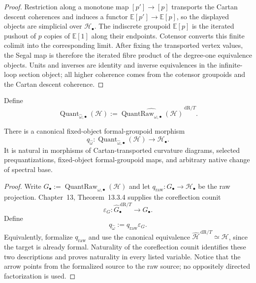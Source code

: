 \begin{proof}
Restriction along a monotone map $[p']\to[p]$ transports the Cartan descent
coherences and induces a functor $\mathbb E[p']\to\mathbb E[p]$, so the displayed
objects are simplicial over $\mathcal H_\bullet$.  The indiscrete groupoid
$\mathbb E[p]$ is the iterated pushout of $p$ copies of $\mathbb E[1]$ along their
endpoints.  Cotensor converts this finite colimit into the corresponding limit.
After fixing the transported vertex values, the Segal map is therefore the
iterated fibre product of the degree-one equivalence objects.  Units and inverses
are identity and inverse equivalences in the infinite-loop section object; all
higher coherence comes from the cotensor groupoids and the Cartan descent
coherence.
\end{proof}

\begin{definition}
\label{def:prequantum-formal-quantomorphism-groupoid}
Define
\[
\boxed{
\operatorname{Quant}_{\widehat\omega,\bullet}(\mathcal H)
:=
\widehat{\operatorname{QuantRaw}_{\widehat\omega,\bullet}(\mathcal H)}^{\,\mathrm{dR}/T}.
}
\]
\end{definition}

\begin{theorem}
\label{thm:prequantum-canonical-quantomorphism-anchor}
There is a canonical fixed-object formal-groupoid morphism
\[
\boxed{
q_{\widehat\omega}:
\operatorname{Quant}_{\widehat\omega,\bullet}(\mathcal H)
\longrightarrow
\mathcal H_\bullet.
}
\]
It is natural in morphisms of Cartan-transported curvature diagrams, selected
prequantizations, fixed-object formal-groupoid maps, and arbitrary native change of
spectral base.
\end{theorem}

\begin{proof}
Write $G_\bullet:=
\operatorname{QuantRaw}_{\widehat\omega,\bullet}(\mathcal H)$ and let
$q_{\mathrm{raw}}:G_\bullet\to\mathcal H_\bullet$ be the raw projection.
Chapter~13, Theorem~13.3.4 supplies the coreflection counit
\[
\varepsilon_G:\widehat G_\bullet^{\,\mathrm{dR}/T}
\longrightarrow G_\bullet.
\]
Define
\[
q_{\widehat\omega}:=q_{\mathrm{raw}}\varepsilon_G.
\]
Equivalently, formalize $q_{\mathrm{raw}}$ and use the canonical equivalence
$\widehat{\mathcal H}^{\,\mathrm{dR}/T}\simeq\mathcal H$, since the target is
already formal.  Naturality of the coreflection counit identifies these two
descriptions and proves naturality in every listed variable.  Notice that the
arrow points from the formalized source to the raw source; no oppositely directed
factorization is used.
\end{proof}

